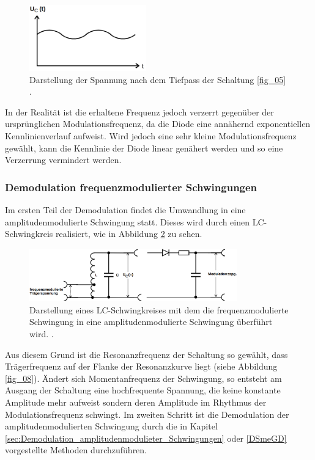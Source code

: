 \begin{figure}
    \centering
    \includegraphics[width=0.45\textwidth]{ressources/A7.png}
    \caption{Darstellung der Spannung nach dem Tiefpass der Schaltung \ref{fig_05} \cite{skript}.}
    \label{fig_07}
\end{figure}

In der Realität ist die erhaltene Frequenz jedoch verzerrt gegenüber der ursprünglichen Modulationsfrequenz, da die Diode eine annähernd exponentiellen Kennlinienverlauf aufweist. Wird jedoch eine sehr kleine Modulationsfrequenz gewählt, kann die Kennlinie der Diode linear genähert werden und so eine Verzerrung vermindert werden.

\subsubsection{Demodulation frequenzmodulierter Schwingungen}
\label{sec:Demodulation_frequenzmodulieter_Schwingungen}
Im ersten Teil der Demodulation findet die Umwandlung in eine amplitudenmodulierte Schwingung statt. Dieses wird durch einen LC-Schwingkreis realisiert, wie in Abbildung \ref{fig_12} zu sehen. 

\begin{figure}
    \centering
    \includegraphics[width=0.80\textwidth]{ressources/A12.png}
    \caption{Darstellung eines LC-Schwingkreises mit dem die frequenzmodulierte Schwingung in eine amplitudenmodulierte Schwingung überführt wird. \cite{skript}.}
    \label{fig_12}
\end{figure}


Aus diesem Grund ist die Resonanzfrequenz der Schaltung so gewählt, dass Trägerfrequenz auf der Flanke der Resonanzkurve liegt (siehe Abbildung \ref{fig_08}). Ändert sich Momentanfrequenz der Schwingung, so entsteht am Ausgang der Schaltung eine hochfrequente Spannung, die keine konstante Amplitude mehr aufweist sondern deren Amplitude im Rhythmus der Modulationsfrequenz schwingt. Im zweiten Schritt ist die Demodulation der amplitudenmodulierten Schwingung durch die in Kapitel \ref{sec:Demodulation_amplitudenmodulieter_Schwingungen} oder \ref{DSmeGD} vorgestellte Methoden durchzuführen. 

